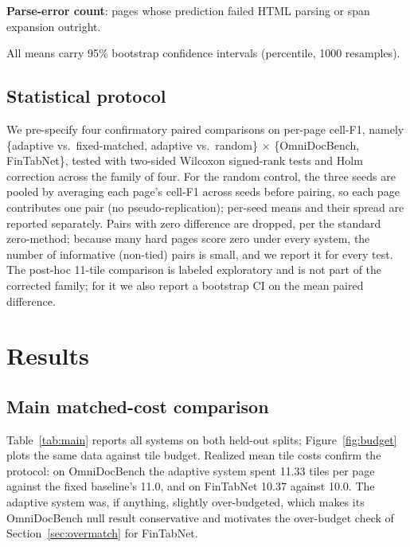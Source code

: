 \documentclass[conference]{IEEEtran}
\begin{document}
\textbf{Parse-error count}: pages whose prediction failed HTML parsing or
span expansion outright.

All means carry 95\% bootstrap confidence intervals (percentile, 1000
resamples).

\subsection{Statistical protocol}
\label{sec:stats}

We pre-specify four confirmatory paired comparisons on per-page cell-F1,
namely \{adaptive vs.\ fixed-matched, adaptive vs.\ random\} $\times$
\{OmniDocBench, FinTabNet\}, tested with two-sided Wilcoxon
signed-rank tests and Holm correction across the family of four. For the
random control, the three seeds are pooled by averaging each page's
cell-F1 across seeds before pairing, so each page contributes one pair
(no pseudo-replication); per-seed means and their spread are reported
separately. Pairs with zero difference are dropped, per the standard
zero-method; because many hard pages score zero under every system, the
number of informative (non-tied) pairs is small, and we report it for
every test. The post-hoc 11-tile comparison is labeled exploratory and is
not part of the corrected family; for it we also report a bootstrap CI on
the mean paired difference.

\section{Results}
\label{sec:results}

\subsection{Main matched-cost comparison}
\label{sec:main}

Table~\ref{tab:main} reports all systems on both held-out splits;
Figure~\ref{fig:budget} plots the same data against tile budget. Realized
mean tile costs confirm the protocol: on OmniDocBench the adaptive system
spent 11.33 tiles per page against the fixed baseline's 11.0, and on
FinTabNet 10.37 against 10.0. The adaptive system was, if anything,
slightly over-budgeted, which makes its OmniDocBench null result
conservative and motivates the over-budget check of
Section~\ref{sec:overmatch} for FinTabNet.
\end{document}
